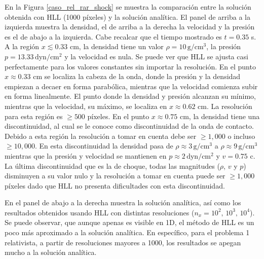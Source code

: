 \documentclass[12pt,a4paper]{book}
\begin{document}
En la Figura \ref{caso_rel_rar_shock} se muestra la comparación entre la solución obtenida con HLL
(1000 píxeles) y la solución analítica.
El panel de arriba a la izquierda muestra la densidad, el de 
arriba a la derecha la velocidad y la presión es el de abajo a la izquierda. Cabe recalcar que  el 
tiempo mostrado es  $t = 0.35$ s.
A la región $x \lesssim 0.33$ cm, la densidad tiene un valor $\rho = 10 \,  \text{g}/ \text{cm}^3$, 
la presión $p = 13.33 \,  \text{dyn}/ \text{cm}^2 $
y la velocidad es nula. Se puede ver que HLL se ajusta casi perfectamente para los valores constantes
sin importar la resolución. 
En el punto $x \approx 0.33$ cm se localiza la cabeza de la onda, donde la presión y la densidad 
empiezan a decaer en forma parabólica, mientras que la velocidad comienza subir en forma linealmente.
El punto donde la densidad y presión alcanzan su mínimo, mientras que la velocidad, su máximo,
se localiza en $x \approx 0.62$ cm. La resolución para esta región es $\geq 500$ 
píxeles. En el punto $x \approx 0.75$ cm, 
la densidad tiene una discontinuidad, al cual se le conoce como discontinuidad de la onda de contacto.
Debido a esta región la resolución a tomar en cuenta debe ser $\geq 1,000$ o incluso $\geq 10,000$.
En esta discontinuidad la densidad pasa de $ \rho \approx 3 \,  \text{g}/ \text{cm}^3$ a
$ \rho \approx 9 \,  \text{g}/ \text{cm}^3$ mientras que la presión 
y velocidad se mantienen en $p \approx 2\,  \text{dyn}/ \text{cm}^2 $ 
y $v = 0.75$ c. La última discontinuidad que es la de choque,
todas las magnitudes ($\rho$, $v$ y $p$) disminuyen a su valor nulo y la resolución a tomar en cuenta
puede ser $\geq 1,000$ píxeles dado que HLL no presenta dificultades con esta discontinuidad.

En el panel de abajo a la derecha muestra la solución analítica, así como los resultados obtenidos 
usando HLL con distintas resoluciones ($n_x = 10^2, \, 10^3, \,10^4$).
Se puede observar, que aunque apenas es visible en 1D, el método de HLL es un poco más aproximado a la solución analítica.  
En específico, para el problema 1 relativista, a partir de resoluciones mayores a 1000, los
resultados se apegan mucho a la solución analítica.
\end{document}
